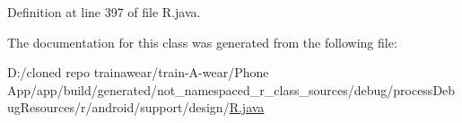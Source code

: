 Definition at line 397 of file R.\+java.



The documentation for this class was generated from the following file\+:\begin{DoxyCompactItemize}
\item 
D\+:/cloned repo trainawear/train-\/\+A-\/wear/\+Phone App/app/build/generated/not\+\_\+namespaced\+\_\+r\+\_\+class\+\_\+sources/debug/process\+Debug\+Resources/r/android/support/design/\mbox{\hyperlink{process_debug_resources_2r_2android_2support_2design_2_r_8java}{R.\+java}}\end{DoxyCompactItemize}
